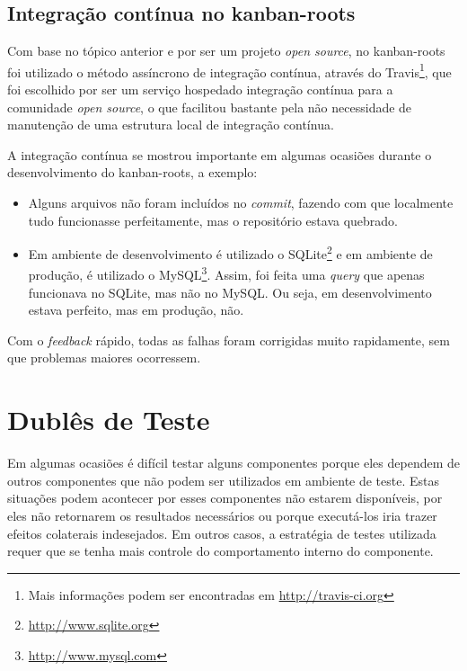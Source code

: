 
\subsection{Integração contínua no kanban-roots} %
\label{sub:integracao_continua_no_kanban}

Com base no tópico anterior e por ser um projeto \textit{open source}, no kanban-roots foi utilizado o método assíncrono de integração contínua, através do Travis\footnote{Mais informações podem ser encontradas em \url{http://travis-ci.org}}, que foi escolhido por ser um serviço hospedado integração contínua para a comunidade \textit{open source}, o que facilitou bastante pela não necessidade de manutenção de uma estrutura local de integração contínua.

A integração contínua se mostrou importante em algumas ocasiões durante o desenvolvimento do kanban-roots, a exemplo:

\begin{itemize}
  \item Alguns arquivos não foram incluídos no \textit{commit}, fazendo com que localmente tudo funcionasse perfeitamente, mas o repositório estava quebrado.
  \item Em ambiente de desenvolvimento é utilizado o SQLite\footnote{\url{http://www.sqlite.org}} e em ambiente de produção, é utilizado o MySQL\footnote{\url{http://www.mysql.com}}. Assim, foi feita uma \textit{query} que apenas funcionava no SQLite, mas não no MySQL. Ou seja, em desenvolvimento estava perfeito, mas em produção, não.
\end{itemize}

Com o \textit{feedback} rápido, todas as falhas foram corrigidas muito rapidamente, sem que problemas maiores ocorressem.




\section{Dublês de Teste} %
\label{sec:dubles_de_teste}

Em algumas ocasiões é difícil testar alguns componentes porque eles dependem de outros componentes que não podem ser utilizados em ambiente de teste. Estas situações podem acontecer por esses componentes não estarem disponíveis, por eles não retornarem os resultados necessários ou porque executá-los iria trazer efeitos colaterais indesejados. Em outros casos, a estratégia de testes utilizada requer que se tenha mais controle do comportamento interno do componente.

